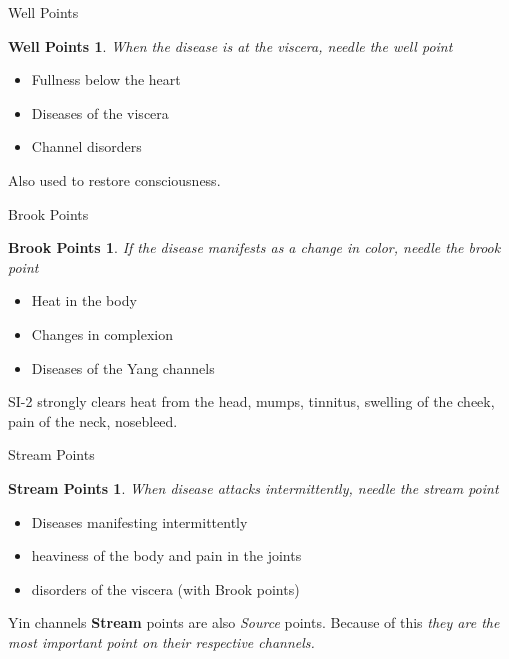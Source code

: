 \begin{frame}{Well Points}
\newtheorem{well}{Well Points}
\begin{well}
When the disease is at the viscera, needle the well point
\end{well}

\begin{itemize}
\item Fullness below the heart
\item Diseases of the viscera
\item Channel disorders
\end{itemize}

\vspace{0.5em}

Also used to restore consciousness.

\end{frame}

\begin{frame}{Brook Points}
\newtheorem{brook}{Brook Points}
\begin{brook}
If the disease manifests as a change in color, needle the brook point
\end{brook}

\begin{itemize}
\item Heat in the body
\item Changes in complexion
\item Diseases of the Yang channels
\end{itemize}

\vspace{0.5em}

SI-2 strongly clears heat from the head, mumps, tinnitus, swelling of the cheek, pain of the neck, nosebleed.

\end{frame}

\begin{frame}{Stream Points}
\newtheorem{stream}{Stream Points}
\begin{stream}
When disease attacks intermittently, needle the stream point
\end{stream}

\begin{itemize}
\item Diseases manifesting intermittently
\item heaviness of the body and pain in the joints
\item disorders of the viscera (with Brook points)
\end{itemize}

\vspace{0.5em}

Yin channels \textbf{Stream} points are also \textit{Source} points. Because of this \textit{they are the most important point on their respective channels.}

\end{frame}

